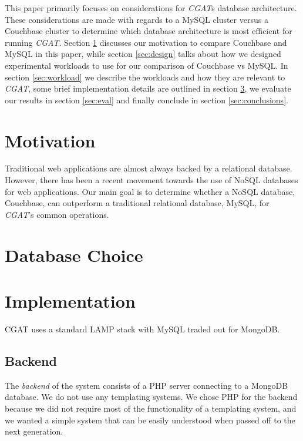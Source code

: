 \documentclass[10pt, conference, compsocconf]{IEEEtran}
\begin{document}

This paper primarily focuses on considerations for \textit{CGAT}s database
architecture. These considerations are made with regards to a MySQL cluster
versus a Couchbase cluster to determine which database architecture is most
efficient for running \textit{CGAT}. Section \ref{sec:motive} discusses our
motivation to compare Couchbase and MySQL in this paper, while section
\ref{sec:design} talks about how we designed experimental workloads to use for
our comparison of Couchbase vs MySQL. In section \ref{sec:workload} we
describe the workloads and how they are relevant to \textit{CGAT}, some brief
implementation details are outlined in section \ref{sec:implementation}, we
evaluate our results in section \ref{sec:eval} and finally conclude in
section \ref{sec:conclusions}.

\section{Motivation}\label{sec:motive}
Traditional web applications are almost always backed by a relational database.
However, there has been a recent movement towards the use of NoSQL databases for
web applications. Our main goal is to determine whether a NoSQL database, Couchbase,
can outperform a traditional relational database, MySQL, for \textit{CGAT}'s
common operations.

\section{Database Choice}

\section{Implementation}\label{sec:implementation}
CGAT uses a standard LAMP stack with MySQL traded out for MongoDB.

\subsection{Backend}
The \textit{backend} of the system consists of a PHP server connecting to a MongoDB database.
We do not use any templating systems.
We chose PHP for the backend because we did not require most of the functionality of a templating system, and we wanted a simple
system that can be easily understood when passed off to the next generation.
\end{document}
